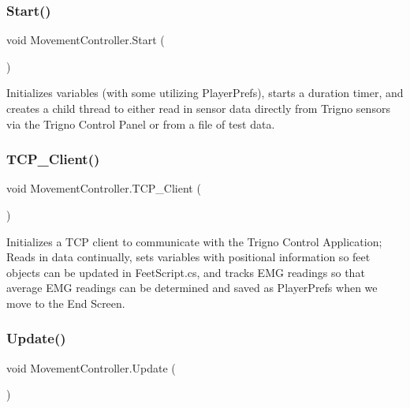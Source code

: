 \subsubsection{\texorpdfstring{Start()}{Start()}}
{\footnotesize\ttfamily void Movement\+Controller.\+Start (\begin{DoxyParamCaption}{ }\end{DoxyParamCaption})\hspace{0.3cm}{\ttfamily [private]}}

Initializes variables (with some utilizing Player\+Prefs), starts a duration timer, and creates a child thread to either read in sensor data directly from Trigno sensors via the Trigno Control Panel or from a file of test data. \mbox{\label{class_movement_controller_a6617aa6bca661e3ccdf0412d8dab2dc2}} 
\subsubsection{\texorpdfstring{T\+C\+P\+\_\+\+Client()}{TCP\_Client()}}
{\footnotesize\ttfamily void Movement\+Controller.\+T\+C\+P\+\_\+\+Client (\begin{DoxyParamCaption}{ }\end{DoxyParamCaption})\hspace{0.3cm}{\ttfamily [private]}}

Initializes a T\+CP client to communicate with the Trigno Control Application; Reads in data continually, sets variables with positional information so feet objects can be updated in Feet\+Script.\+cs, and tracks E\+MG readings so that average E\+MG readings can be determined and saved as Player\+Prefs when we move to the End Screen. \mbox{\label{class_movement_controller_a380c48ddf4dadb2df3d58cad2f6718a7}} 
\subsubsection{\texorpdfstring{Update()}{Update()}}
{\footnotesize\ttfamily void Movement\+Controller.\+Update (\begin{DoxyParamCaption}{ }\end{DoxyParamCaption})\hspace{0.3cm}{\ttfamily [private]}}

